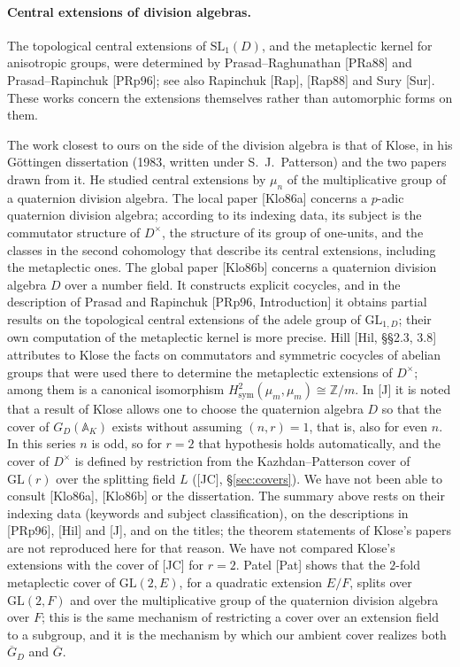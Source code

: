 \documentclass[12pt]{article}
\newcommand{\ov}[1]{\overline{#1}}
\newcommand{\A}{\mathbb{A}}
\newcommand{\Z}{\mathbb{Z}}
\newcommand{\GL}{\mathrm{GL}}
\newcommand{\SL}{\mathrm{SL}}
\newcommand{\Gb}{\ov{G}}
\newcommand{\GDb}{\ov{G}_D}
\theoremstyle{plain}
\theoremstyle{definition}
\begin{document}
\paragraph{Central extensions of division algebras.} The topological central extensions of $\SL_1(D)$, and the metaplectic kernel for anisotropic groups, were determined by Prasad--Raghunathan [PRa88] and Prasad--Rapinchuk [PRp96]; see also Rapinchuk [Rap], [Rap88] and Sury [Sur]. These works concern the extensions themselves rather than automorphic forms on them.

The work closest to ours on the side of the division algebra is that of Klose, in his G\"ottingen dissertation (1983, written under S.~J.~Patterson) and the two papers drawn from it. He studied central extensions by $\mu_n$ of the multiplicative group of a quaternion division algebra. The local paper [Klo86a] concerns a $p$-adic quaternion division algebra; according to its indexing data, its subject is the commutator structure of $D^\times$, the structure of its group of one-units, and the classes in the second cohomology that describe its central extensions, including the metaplectic ones. The global paper [Klo86b] concerns a quaternion division algebra $D$ over a number field. It constructs explicit cocycles, and in the description of Prasad and Rapinchuk [PRp96, Introduction] it obtains partial results on the topological central extensions of the adele group of $\mathrm{GL}_{1,D}$; their own computation of the metaplectic kernel is more precise. Hill [Hil, \S\S2.3, 3.8] attributes to Klose the facts on commutators and symmetric cocycles of abelian groups that were used there to determine the metaplectic extensions of $D^\times$; among them is a canonical isomorphism $H^2_{\mathrm{sym}}(\mu_m,\mu_m)\cong\Z/m$. In [J] it is noted that a result of Klose allows one to choose the quaternion algebra $D$ so that the cover of $G_D(\A_K)$ exists without assuming $(n,r)=1$, that is, also for even $n$. In this series $n$ is odd, so for $r=2$ that hypothesis holds automatically, and the cover of $D^\times$ is defined by restriction from the Kazhdan--Patterson cover of $\GL(r)$ over the splitting field $L$ ([JC], \S\ref{sec:covers}). We have not been able to consult [Klo86a], [Klo86b] or the dissertation. The summary above rests on their indexing data (keywords and subject classification), on the descriptions in [PRp96], [Hil] and [J], and on the titles; the theorem statements of Klose's papers are not reproduced here for that reason. We have not compared Klose's extensions with the cover of [JC] for $r=2$. Patel [Pat] shows that the $2$-fold metaplectic cover of $\GL(2,E)$, for a quadratic extension $E/F$, splits over $\GL(2,F)$ and over the multiplicative group of the quaternion division algebra over $F$; this is the same mechanism of restricting a cover over an extension field to a subgroup, and it is the mechanism by which our ambient cover realizes both $\GDb$ and $\Gb$.
\end{document}
